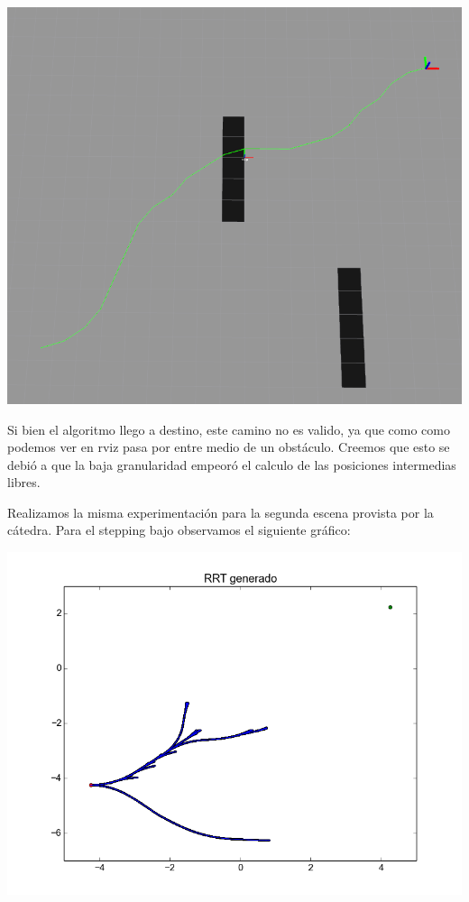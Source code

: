 \includegraphics[scale=0.3]{velocidad/stepping_alto_rviz1.png}

Si bien el algoritmo llego a destino, este camino no es valido, ya que como como podemos ver en rviz pasa por entre medio de un obstáculo. Creemos que esto se debió a que la baja granularidad empeoró el calculo de las posiciones intermedias libres.

Realizamos la misma experimentación para la segunda escena provista por la cátedra. Para el stepping bajo observamos el siguiente gráfico:

\includegraphics[scale=0.5]{velocidad/stepping_bajo2.png}

